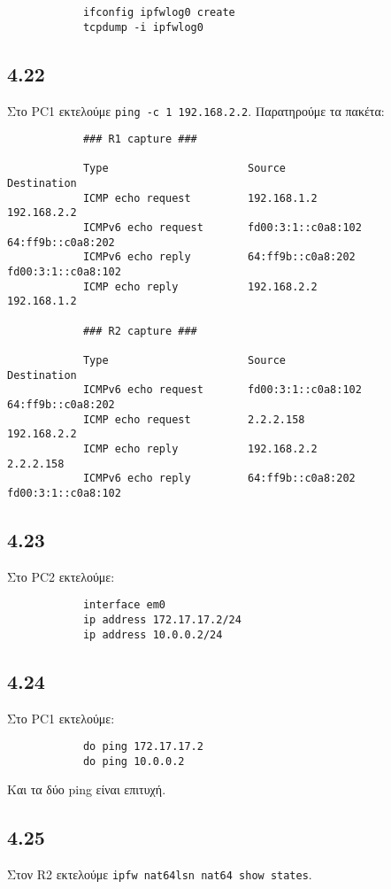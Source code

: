 \documentclass[a4paper, 12pt]{article}
\begin{document}
		\begin{verbatim}
			ifconfig ipfwlog0 create
			tcpdump -i ipfwlog0
		\end{verbatim}

	\subsection*{4.22}
		Στο PC1 εκτελούμε \verb|ping -c 1 192.168.2.2|. Παρατηρούμε τα πακέτα:
		
		\begin{verbatim}
			### R1 capture ###
		
			Type                      Source                   Destination 
			ICMP echo request         192.168.1.2              192.168.2.2
			ICMPv6 echo request       fd00:3:1::c0a8:102       64:ff9b::c0a8:202
			ICMPv6 echo reply         64:ff9b::c0a8:202        fd00:3:1::c0a8:102
			ICMP echo reply           192.168.2.2              192.168.1.2
			
			### R2 capture ###
			
			Type                      Source                   Destination
			ICMPv6 echo request       fd00:3:1::c0a8:102       64:ff9b::c0a8:202
			ICMP echo request         2.2.2.158                192.168.2.2
			ICMP echo reply           192.168.2.2              2.2.2.158
			ICMPv6 echo reply         64:ff9b::c0a8:202        fd00:3:1::c0a8:102
		\end{verbatim}

	\subsection*{4.23}
		Στο PC2 εκτελούμε:
		
		\begin{verbatim}
			interface em0
			ip address 172.17.17.2/24
			ip address 10.0.0.2/24
		\end{verbatim}

	\subsection*{4.24}
		Στο PC1 εκτελούμε:
		
		\begin{verbatim}
			do ping 172.17.17.2
			do ping 10.0.0.2
		\end{verbatim}
		
		Και τα δύο ping είναι επιτυχή.

	\subsection*{4.25}
		Στον R2 εκτελούμε \verb|ipfw nat64lsn nat64 show states|.
\end{document}
